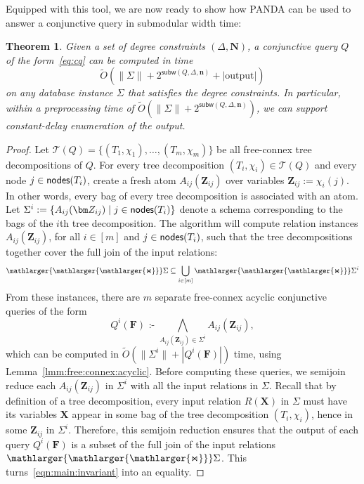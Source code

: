 \documentclass[10pt,a4paper]{article}
\newtheorem{theorem}{Theorem}[section]
\newcommand{\norm}[1]{\|#1\|}
\newcommand{\set}[1]{\{#1\}}                    %
\newcommand{\calT}{\mathcal T}
\newcommand{\cd}{\text{ :- }}
\newcommand{\bigjoin}{\mathlarger{\mathlarger{\mathlarger{\Join}}}}
\newcommand{\nodes}{\text{\sf nodes}}
\newcommand{\panda}{\textsf{PANDA}\xspace}
\newcommand{\subm}{\textsf{subw}}
\begin{document}
%
Equipped with this tool, we are now ready to show how \panda can be used to answer a
conjunctive query in submodular width time:

\begin{theorem}  Given a set of degree constraints
  $(\Delta, \bm N)$, a conjunctive query $Q$ of the form~\eqref{eq:cq} can be computed in
  time
  \[ \tilde O(\norm{\Sigma} + 2^{\subm(Q, \Delta, \bm n)} + |\text{output}|) \]
  on any database instance $\Sigma$ that satisfies the degree constraints.
  In particular, within a preprocessing time of $\tilde O(\norm{\Sigma} + 2^{\subm(Q, \Delta, \bm n)})$,
  we can support constant-delay enumeration of the output.
  \label{thm:algo:subw}
\end{theorem}
\begin{proof}
  Let $\calT(Q)=\set{(T_1,\chi_1), \ldots, (T_m, \chi_m)}$ be all free-connex tree
  decompositions of $Q$. For every tree decomposition $(T_i, \chi_i) \in \calT(Q)$ and every
  node $j \in \nodes(T_i)$, create a fresh atom $A_{ij}(\bm Z_{ij})$ over variables $\bm
  Z_{ij} := \chi_i(j)$. In other words, every bag of every tree decomposition is associated
  with an atom. Let $\Sigma^i := \{ A_{ij}(\bm Z_{ij}) \mid j \in \nodes(T_i)
  \}$ denote a schema corresponding to the bags of the $i$th tree decomposition. The
  algorithm will compute relation instances $A_{ij}(\bm Z_{ij})$, for all $i \in [m]$ and $j
  \in \nodes(T_i)$, such that the tree decompositions together cover the full join of the
  input relations:
  \begin{align}
    \bigjoin \Sigma \subseteq \bigcup_{i \in [m]} \bigjoin \Sigma^i
    \label{eqn:main:invariant}
  \end{align}
  From these instances, there are $m$ separate free-connex acyclic conjunctive
  queries of the form
  \[Q^i(\bm F) \cd \bigwedge_{A_{ij}(\bm Z_{ij}) \in \Sigma^i}A_{ij}(\bm Z_{ij}),\] which
  can be computed in $\tilde O(\norm{\Sigma^i} + |Q^i(\bm F)|)$ time, using
  Lemma~\ref{lmm:free:connex:acyclic}.
  Before computing these queries, we semijoin reduce each $A_{ij}(\bm Z_{ij})$ in $\Sigma^i$
  with all the input relations in $\Sigma$.
  Recall that by definition of a tree decomposition, every input relation $R(\bm X)$ in $\Sigma$
  must have its variables $\bm X$ appear in some bag of the tree decomposition $(T_i, \chi_i)$, hence
  in some $\bm Z_{ij}$ in $\Sigma^i$.
  Therefore, this semijoin reduction ensures that the output of each query $Q^i(\bm F)$ is a subset of the full join of the input relations $\bigjoin \Sigma$. This turns~\eqref{eqn:main:invariant} into an equality.


\end{proof}
\end{document}
